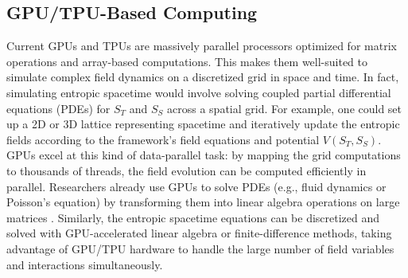 \documentclass[11pt,a4paper]{article} %
\begin{document}
\subsection{GPU/TPU-Based Computing}
Current GPUs and TPUs are massively parallel processors optimized for matrix operations and array-based computations. This makes them well-suited to simulate complex field dynamics on a discretized grid in space and time. In fact, simulating entropic spacetime would involve solving coupled partial differential equations (PDEs) for \(S_T\) and \(S_S\) across a spatial grid. For example, one could set up a 2D or 3D lattice representing spacetime and iteratively update the entropic fields according to the framework's field equations and potential \(V(S_T, S_S)\). GPUs excel at this kind of data-parallel task: by mapping the grid computations to thousands of threads, the field evolution can be computed efficiently in parallel. Researchers already use GPUs to solve PDEs (e.g., fluid dynamics or Poisson’s equation) by transforming them into linear algebra operations on large matrices \cite{nvidia-gpugems}. Similarly, the entropic spacetime equations can be discretized and solved with GPU-accelerated linear algebra or finite-difference methods, taking advantage of GPU/TPU hardware to handle the large number of field variables and interactions simultaneously.
\end{document}
